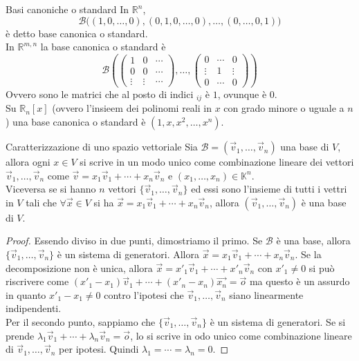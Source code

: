 \begin{Ex}{Basi canoniche o standard}
  In $\mathbb{R}^n$,
  \begin{equation*}
    \mathscr{B}\bigl((1,0,\ldots,0),(0,1,0,\ldots,0),\ldots,(0,\ldots,0,1)\bigr)
  \end{equation*}
  è detto base canonica o standard.\\[\baselineskip]
  In $\mathbb{R}^{m,n}$ la base canonica o standard è
  \begin{equation*}
    \mathscr{B} \left(
      \begin{pmatrix}
        1 & 0 &\cdots\\
        0 & 0 & \cdots\\
        \vdots & \vdots & \cdots
      \end{pmatrix},\ldots,
      \begin{pmatrix}
        0 & \cdots & 0\\
        \vdots & 1 & \vdots\\
        0 & \cdots & 0
      \end{pmatrix}
    \right)
  \end{equation*}
  Ovvero sono le matrici che al posto di indici $_{ij}$ è $1$, ovunque è
  $0$.\\[\baselineskip]
  Su $\mathbb{R}_n[x]$ (ovvero l'insieem dei polinomi reali in $x$ con grado minore o
  uguale a $n$) una base canonica o standard è $(1,x,x^2,\ldots,x^n)$.
\end{Ex}

\begin{Thm}{Caratterizzazione di uno spazio vettoriale}
  Sia $\mathscr{B}=(\vec{v}_1,\ldots,\vec{v}_n)$ una base di $V$, allora ogni $x\in V$
  si scrive in un modo unico come combinazione lineare dei vettori $\vec{v}_1,\ldots,
  \vec{v}_n$ come $\vec{v}=x_1\vec{v}_1+\cdots+x_n\vec{v}_n$ e $(x_1,\ldots,x_n)\in
  \mathbb{K}^n$.\\
  Viceversa se si hanno $n$ vettori $\{\vec{v}_1,\ldots,\vec{v}_n\}$ ed essi sono
  l'insieme di tutti i vettri in $V$ tali che $\forall \vec{x}\in V$ si ha
  $\vec{x}=x_1\vec{v}_1+\cdots+x_n\vec{v}_n$, allora $(\vec{v}_1,\ldots,\vec{v}_n)$ è
  una base di $V$.
\end{Thm}

\begin{proof}
  Essendo diviso in due punti, dimostriamo il primo. Se $\mathscr{B}$ è una base, allora
  $\{\vec{v}_1,\ldots,\vec{v}_n\}$ è un sistema di generatori. Allora
  $\vec{x}=x_1\vec{v}_1+\cdots+x_n\vec{v}_n$. Se la decomposizione non è unica, allora
  $\vec{x}=x'_1\vec{v}_1+\cdots+x'_n\vec{v}_n$ con $x'_1\neq0$ si può riscrivere come
  $(x'_1-x_1)\vec{v}_1+\cdots+(x'_n-x_n)\vec{x_n}=\vec{o}$ ma questo è un assurdo in
  quanto $x'_1-x_1\neq0$ contro l'ipotesi che $\vec{v}_1,\ldots,\vec{v}_n$ siano
  linearmente indipendenti.\\
  Per il secondo punto, sappiamo che $\{\vec{v}_1,\ldots,\vec{v}_n\}$ è un sistema di
  generatori. Se si prende $\lambda_1\vec{v}_1+\cdots+\lambda_n\vec{v}_n=\vec{o}$, lo si
  scrive in odo unico come combinazione lineare di $\vec{v}_1,\ldots,\vec{v}_n$ per
  ipotesi. Quindi $\lambda_1=\cdots=\lambda_n=0$.
\end{proof}

